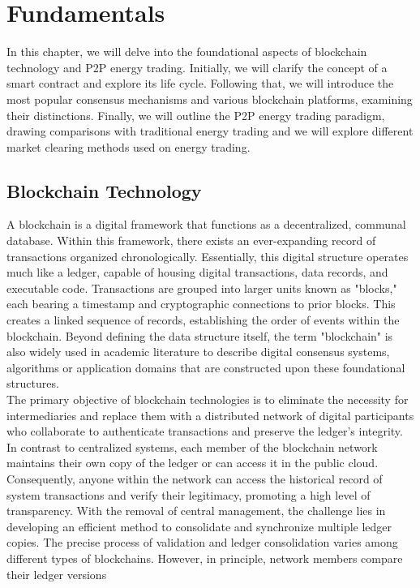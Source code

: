 \chapter{Fundamentals} \label{fandamentals}
\label{chapter2}
In this chapter, we will delve into the foundational aspects of blockchain technology and P2P energy trading.
Initially, we will clarify the concept of a smart contract and explore its life cycle. Following that, we will introduce the most popular consensus mechanisms
and various blockchain platforms, examining their distinctions. Finally, we will outline the P2P energy trading paradigm,
drawing comparisons with traditional energy trading and we will explore different market clearing methods used on energy trading.

\section{Blockchain Technology}
A blockchain is a digital framework that functions as a decentralized, communal database. Within this framework, there exists an ever-expanding record of transactions
organized chronologically. Essentially, this digital structure operates much like a ledger, capable of housing digital transactions, data records, and executable code.
Transactions are grouped into larger units known as "blocks," each bearing a timestamp and cryptographic connections to prior blocks. This creates a linked sequence of records,
establishing the order of events within the blockchain. Beyond defining the data structure itself, the term "blockchain" is also widely used in academic literature to describe digital consensus
systems, algorithms or application domains that are constructed upon these foundational structures.\\
The primary objective of blockchain technologies is to eliminate the necessity for intermediaries and replace them with a distributed network of digital participants who
collaborate to authenticate transactions and preserve the ledger's integrity. In contrast to centralized systems, each member of the blockchain network maintains their own copy
of the ledger or can access it in the public cloud. Consequently, anyone within the network can access the historical record of system transactions and verify their legitimacy,
promoting a high level of transparency. With the removal of central management, the challenge lies in developing an efficient method to consolidate and synchronize multiple ledger
copies. The precise process of validation and ledger consolidation varies among different types of blockchains. However, in principle, network members compare their ledger versions
